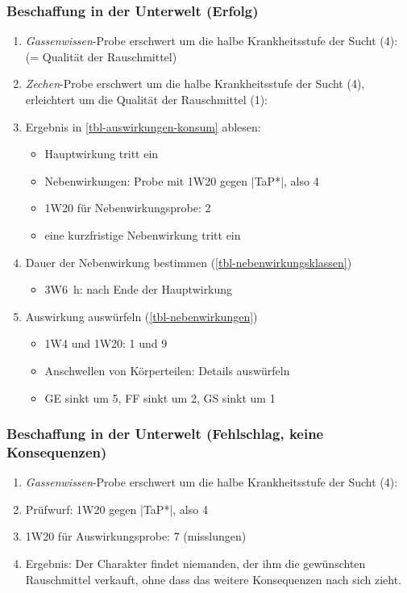 \subsubsection{Beschaffung in der Unterwelt (Erfolg)}
\begin{enumerate}
	\item \emph{Gassenwissen}-Probe erschwert um die halbe Krankheitsstufe der Sucht (4):  (= Qualität der Rauschmittel)
	\item \emph{Zechen}-Probe erschwert um die halbe Krankheitsstufe der Sucht (4), erleichtert um die Qualität der Rauschmittel (1): 
	\item Ergebnis in \vref{tbl-auswirkungen-konsum} ablesen:
	\begin{itemize}
		\item Hauptwirkung tritt ein
		\item Nebenwirkungen: Probe mit 1W20 gegen |TaP*|, also 4
		\item 1W20 für Nebenwirkungsprobe: 2
		\item eine kurzfristige Nebenwirkung tritt ein
	\end{itemize}
	\item Dauer der Nebenwirkung bestimmen (\vref{tbl-nebenwirkungsklassen})
	\begin{itemize}
		\item 3W6~h:  nach Ende der Hauptwirkung
	\end{itemize}
	\item Auswirkung auswürfeln (\vref{tbl-nebenwirkungen})
	\begin{itemize}
		\item 1W4 und 1W20: 1 und 9
		\item Anschwellen von Körperteilen: Details auswürfeln
		\item GE sinkt um 5, FF sinkt um 2, GS sinkt um 1
	\end{itemize}
\end{enumerate}

\subsubsection{Beschaffung in der Unterwelt (Fehlschlag, keine Konsequenzen)}
\begin{enumerate}
	\item \emph{Gassenwissen}-Probe erschwert um die halbe Krankheitsstufe der Sucht (4): 
	\item Prüfwurf: 1W20 gegen |TaP*|, also 4
	\item 1W20 für Auswirkungsprobe: 7 (misslungen)
	\item Ergebnis: Der Charakter findet niemanden, der ihm die gewünschten Rauschmittel verkauft, ohne dass das weitere Konsequenzen nach sich zieht.
\end{enumerate}

